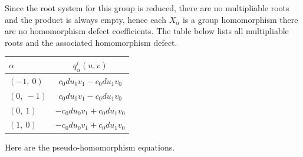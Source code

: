 \documentclass[11pt]{article}
\newcommand{\noi}{\noindent}
\theoremstyle{definition}
\newif\ifrootsystemreduced
\begin{document}
\ifrootsystemreduced
Since the root system for this group is reduced, there are no multipliable roots and the product is always empty, hence each $X_\alpha$ is a group homomorphism there are no homomorphism defect coefficients.
\else
The table below lists all multipliable roots and the associated homomorphism defect.

\bigskip

\noindent \begin{tabular}{|l|c|}
    \hline
    $\alpha$ & $q^i_\alpha(u,v)$ \\
    \hline
    $\left( -1, \  0\right)$ & ${c_{0} d u_{0} v_{1} - c_{0} d u_{1} v_{0}}$ \\
    \hline
    $\left( 0, \  -1\right)$ & ${c_{0} d u_{0} v_{1} - c_{0} d u_{1} v_{0}}$ \\
    \hline
    $\left( 0, \  1\right)$ & ${- c_{0} d u_{0} v_{1} + c_{0} d u_{1} v_{0}}$ \\
    \hline
    $\left( 1, \  0\right)$ & ${- c_{0} d u_{0} v_{1} + c_{0} d u_{1} v_{0}}$ \\
    \hline
\end{tabular}


\bigskip

\noi Here are the pseudo-homomorphism equations.
\end{document}
